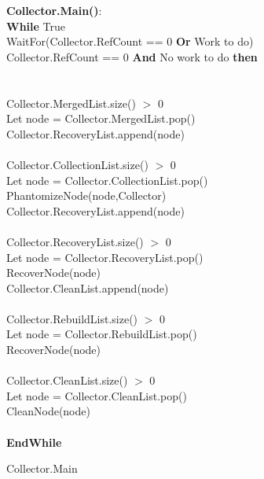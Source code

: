 \setlength{\textfloatsep}{0pt}
\begin{algorithm}[ht]
{\small
{\bf Collector.Main()}:\\
{\Indp
{\bf While} True \\
\quad WaitFor(Collector.RefCount == 0 {\bf Or} Work to do)\\
 Collector.RefCount == 0 {\bf And} No work to do {\bf then}\\
\quad {}\\
\\
 Collector.MergedList.size() $>$ 0\\
\quad \quad Let node = Collector.MergedList.pop()\\
\quad \quad Collector.RecoveryList.append(node)\\
\\
 Collector.CollectionList.size() $>$ 0\\
\quad \quad Let node = Collector.CollectionList.pop()\\
\quad \quad PhantomizeNode(node,Collector)\\
\quad \quad Collector.RecoveryList.append(node)\\
\\
 Collector.RecoveryList.size() $>$ 0\\
\quad \quad Let node = Collector.RecoveryList.pop()\\
\quad \quad RecoverNode(node)\\
\quad \quad Collector.CleanList.append(node)\\
\\
 Collector.RebuildList.size() $>$ 0\\
\quad \quad Let node = Collector.RebuildList.pop()\\
\quad \quad RecoverNode(node)\\
\\
 Collector.CleanList.size() $>$ 0\\
\quad \quad Let node = Collector.CleanList.pop()\\
\quad \quad CleanNode(node)\\
\\
{\bf EndWhile}\\
}
}
\caption{Collector.Main}
\label{algorithm:main}
\end{algorithm}
